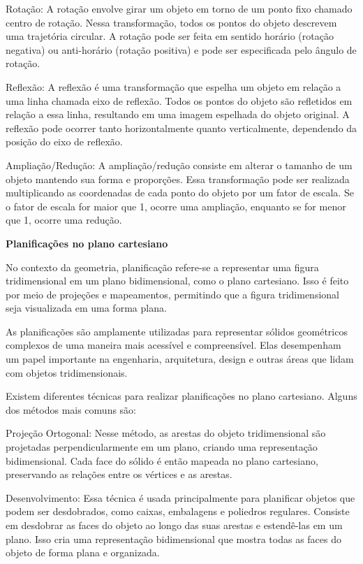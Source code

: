 Rotação: A rotação envolve girar um objeto em torno de um ponto fixo
chamado centro de rotação. Nessa transformação, todos os pontos do
objeto descrevem uma trajetória circular. A rotação pode ser feita em
sentido horário (rotação negativa) ou anti-horário (rotação positiva) e
pode ser especificada pelo ângulo de rotação.

Reflexão: A reflexão é uma transformação que espelha um objeto em
relação a uma linha chamada eixo de reflexão. Todos os pontos do objeto
são refletidos em relação a essa linha, resultando em uma imagem
espelhada do objeto original. A reflexão pode ocorrer tanto
horizontalmente quanto verticalmente, dependendo da posição do eixo de
reflexão.

Ampliação/Redução: A ampliação/redução consiste em alterar o tamanho de
um objeto mantendo sua forma e proporções. Essa transformação pode ser
realizada multiplicando as coordenadas de cada ponto do objeto por um
fator de escala. Se o fator de escala for maior que 1, ocorre uma
ampliação, enquanto se for menor que 1, ocorre uma redução.

\textbf{Planificações no plano cartesiano}

No contexto da geometria, planificação refere-se a representar uma
figura tridimensional em um plano bidimensional, como o plano
cartesiano. Isso é feito por meio de projeções e mapeamentos, permitindo
que a figura tridimensional seja visualizada em uma forma plana.

As planificações são amplamente utilizadas para representar sólidos
geométricos complexos de uma maneira mais acessível e compreensível.
Elas desempenham um papel importante na engenharia, arquitetura, design
e outras áreas que lidam com objetos tridimensionais.

Existem diferentes técnicas para realizar planificações no plano
cartesiano. Alguns dos métodos mais comuns são:

Projeção Ortogonal: Nesse método, as arestas do objeto tridimensional
são projetadas perpendicularmente em um plano, criando uma representação
bidimensional. Cada face do sólido é então mapeada no plano cartesiano,
preservando as relações entre os vértices e as arestas.

Desenvolvimento: Essa técnica é usada principalmente para planificar
objetos que podem ser desdobrados, como caixas, embalagens e poliedros
regulares. Consiste em desdobrar as faces do objeto ao longo das suas
arestas e estendê-las em um plano. Isso cria uma representação
bidimensional que mostra todas as faces do objeto de forma plana e
organizada.

